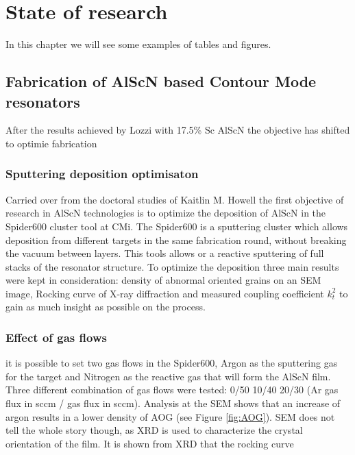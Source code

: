 \chapter{State of research}
In this chapter we will see some examples of tables and figures.

\section{Fabrication of AlScN based Contour Mode resonators}
After the results achieved by Lozzi \cite{lozzi_al083sc017n_2019} with 17.5\% Sc AlScN the objective has shifted to optimie fabrication 
\subsection{Sputtering deposition optimisaton}
Carried over from the doctoral studies of Kaitlin M. Howell \cite{howell_dielectric_2019} the first objective of research in AlScN technologies is to optimize the deposition of AlScN in the Spider600 cluster tool at CMi. The Spider600 is a sputtering cluster which allows deposition from different targets in the same fabrication round, without breaking the vacuum between layers. This tools allows or a reactive sputtering of full stacks of the resonator structure. To optimize the deposition three main results were kept in consideration: density of abnormal oriented grains on an SEM image, Rocking curve of X-ray diffraction and measured coupling coefficient $k_t^2$ to gain as much insight as possible on the process. 

\subsection{Effect of gas flows}
it is possible to set two gas flows in the Spider600, Argon as the sputtering gas for the target and Nitrogen as the reactive gas that will form the AlScN film. Three different combination of gas flows were tested: 0/50 10/40 20/30 (Ar gas flux in sccm /  gas flux in sccm). Analysis at the SEM shows that an increase of argon results in a lower density of AOG (see Figure \ref{fig:AOG}). SEM does not tell the whole story though, as XRD is used to characterize the crystal orientation of the film. It is shown from XRD that the rocking curve 

